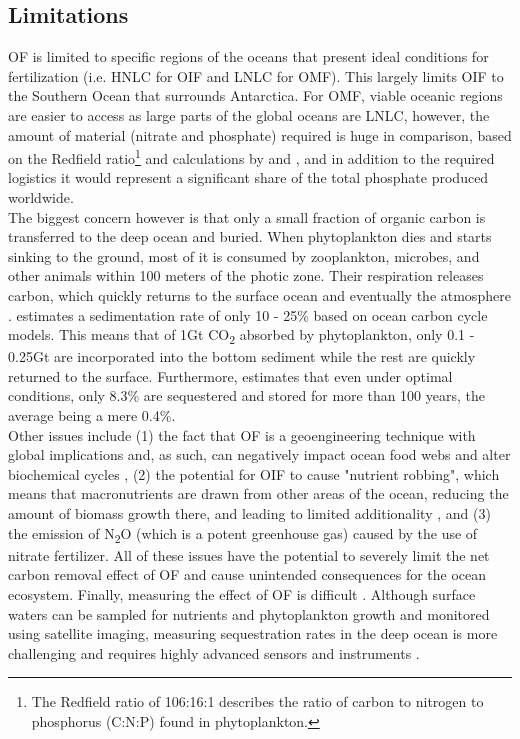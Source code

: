 \subsection*{Limitations}
OF is limited to specific regions of the oceans that present ideal conditions for fertilization (i.e. HNLC for OIF and LNLC for OMF). This largely limits OIF to the Southern Ocean that surrounds Antarctica. For OMF, viable oceanic regions are easier to access as large parts of the global oceans are LNLC, however, the amount of material (nitrate and phosphate) required is huge in comparison, based on the Redfield ratio\footnote{The Redfield ratio of 106:16:1 describes the ratio of carbon to nitrogen to phosphorus (C:N:P) found in phytoplankton.} and calculations by \textcite{S.F.Jones2014TheNourishment} and \textcite{Harrison2017GlobalFertilization}, and in addition to the required logistics it would represent a significant share of the total phosphate produced worldwide.\\
The biggest concern however is that only a small fraction of organic carbon is transferred to the deep ocean and buried. When phytoplankton dies and starts sinking to the ground, most of it is consumed by zooplankton, microbes, and other animals within 100 meters of the photic zone. Their respiration releases carbon, which quickly returns to the surface ocean and eventually the atmosphere \parencite[82, 84]{NAS2022ASequestration}.
\textcite{Zeebe2005FeasibilityLevels} estimates a sedimentation rate of only 10 - 25\% based on ocean carbon cycle models. This means that of 1Gt CO\textsubscript{2} absorbed by phytoplankton, only 0.1 - 0.25Gt are incorporated into the bottom sediment while the rest are quickly returned to the surface. Furthermore, \textcite{Harrison2013AOcean} estimates that even under optimal conditions, only 8.3\% are sequestered and stored for more than 100 years, the average being a mere 0.4\%.\\
Other issues include (1) the fact that OF is a geoengineering technique with global implications and, as such, can negatively impact ocean food webs and alter biochemical cycles \parencite{Chisholm2001Dis-CreditingFertilization, Zeebe2005FeasibilityLevels}, (2) the potential for OIF to cause "nutrient robbing", which means that macronutrients are drawn from other areas of the ocean, reducing the amount of biomass growth there, and leading to limited additionality \parencite{Zeebe2005FeasibilityLevels}, and (3) the emission of N\textsubscript{2}O (which is a potent greenhouse gas) caused by the use of nitrate fertilizer. All of these issues have the potential to severely limit the net carbon removal effect of OF and cause unintended consequences for the ocean ecosystem.
Finally, measuring the effect of OF is difficult \parencite[87]{NAS2022ASequestration}. Although surface waters can be sampled for nutrients and phytoplankton growth and monitored using satellite imaging, measuring sequestration rates in the deep ocean is more challenging and requires highly advanced sensors and instruments \parencite{Chisholm2001Dis-CreditingFertilization, NAS2022ASequestration}.
